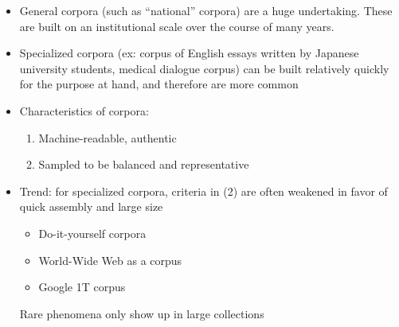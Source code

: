 \documentclass[a4paper,landscape,headrule,footrule]{foils}
\begin{document}
\begin{itemize}
\item General corpora (such as “national” corpora) are a huge undertaking.
These are built on an institutional scale over the course of many years.
\item  Specialized corpora (ex: corpus of English essays written by Japanese
university students, medical dialogue corpus) can be built relatively
quickly for the purpose at hand, and therefore are more common
\item Characteristics of corpora:
  \begin{enumerate}
  \item Machine-readable, authentic
  \item Sampled to be balanced and representative
  \end{enumerate}
\newpage
\item  Trend: for specialized corpora, criteria in (2) are often weakened in favor of quick assembly and large size
  \begin{itemize}
  \item Do-it-yourself corpora
  \item World-Wide Web as a corpus
  \item Google 1T corpus
  \end{itemize}
 Rare phenomena only show up in large collections
\end{itemize}
\end{document}
